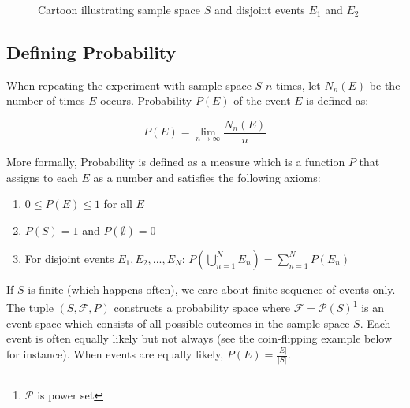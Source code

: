 \documentclass[12pt, a4paper]{article}
\newcounter{exa}
\begin{document}
\begin{figure}[H]
\centering
{}
\caption{Cartoon illustrating sample space $S$ and disjoint events $E_1$ and $E_2$}
\end{figure}

\subsection{Defining Probability}

When repeating the experiment with sample space $S$ $n$ times, let $N_n (E)$ be the number of times $E$ occurs. Probability $P(E)$ of the event $E$ is defined as:

$$\displaystyle P(E) = \lim_{n \to \infty} \frac{N_n (E)}{n}$$

More formally, Probability is defined as a measure which is a function $P$ that assigns to each $E$ as a number and satisfies the following axioms:

\begin{enumerate}[i]
  \item $0 \le P(E) \le 1$ for all $E$
  \item $P(S)=1$ and $P(\emptyset)=0$
  \item For disjoint events $E_1, E_2, ..., E_N$: $\displaystyle P\left( \bigcup_{n=1}^N E_n \right)=\sum_{n=1}^N P(E_n)$
\end{enumerate}

If $S$ is finite (which happens often), we care about finite sequence of events only. The tuple $(S,\mathcal{F},P)$ constructs a probability space where $\mathcal{F}=\mathcal{P}(S)$\footnote{$\mathcal{P}$ is power set} is an event space which consists of all possible outcomes in the sample space $S$. Each event is often equally likely but not always (see the coin-flipping example below for instance). When events are equally likely, $P(E)=\frac{|E|}{|S|}$.
\end{document}
